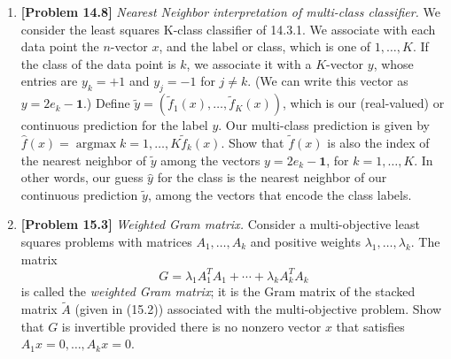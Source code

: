 \begin{enumerate}[label=(\alph*)]
	\item \textbf{[Problem 14.8]} \textit{Nearest Neighbor interpretation of
		      multi-class classifier.} We consider the least squares K-class
	      classifier of 14.3.1. We associate with each data point the $n$-vector
	      $x$, and the label or class, which is one of $1, \ldots, K$. If the
	      class of the data point is $k$, we associate it with a $K$-vector $y$,
	      whose entries are $y_k = +1$ and $y_j = -1$ for $j \neq k$. (We can
	      write this vector as $y = 2e_k - \mathbf{1}$.) Define $\tilde{y} =
		      ( \tilde{f}_1(x), \ldots, \tilde{f}_K(x) )$, which is
	      our (real-valued) or continuous prediction for the label $y$. Our
	      multi-class prediction is given by $\hat{f}(x) = \operatorname{argmax}{k =
			      1,\ldots,K} \tilde{f}_k(x)$. Show that $\tilde{f}(x)$ is also the
	      index of the nearest neighbor of $\tilde{y}$ among the vectors
	      $y = 2e_k - \mathbf{1}$, for $k = 1, \ldots, K$. In other words, our
	      guess $\hat{y}$ for the class is the nearest neighbor of our
	      continuous prediction $\tilde{y}$, among the vectors that encode the
	      class labels.

	\item \textbf{[Problem 15.3]} \textit{Weighted Gram matrix.} Consider a
	      multi-objective least squares problems with matrices $A_1, \ldots,
		      A_k$ and positive weights $\lambda_1, \ldots, \lambda_k$. The matrix
	      $$ G = \lambda_1 A_1^T A_1 + \cdots + \lambda_k A_k^T A_k $$
	      is called the \textit{weighted Gram matrix}; it is the Gram matrix of
	      the stacked matrix $\tilde{A}$ (given in (15.2)) associated with the
	      multi-objective problem. Show that $G$ is invertible provided there is
	      no nonzero vector $x$ that satisfies $A_1 x = 0, \ldots, A_k x = 0$.


\end{enumerate}
